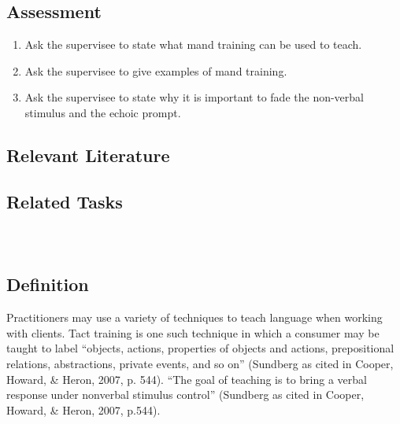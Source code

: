 \subsection{Assessment}
\begin{enumerate}
\item Ask the supervisee to state what mand training can be used to teach.
\item Ask the supervisee to give examples of mand training.
\item Ask the supervisee to state why it is important to fade the non-verbal stimulus and the echoic prompt.  
\end{enumerate}
%
\subsection{Relevant Literature}
\begin{refsection}
\nocite{test,alang2017police,clayton2018black}
\printbibliography[heading=none]
\end{refsection}
%
\subsection{Related Tasks}
\fourFKFourtyFour{}\\
%
%
%
%
%
%
\section{\fourdTwelve{}}
\subsection{Definition}
Practitioners may use a variety of techniques to teach language when working with clients.  Tact training is one such technique in which a consumer may be taught to label ``objects, actions, properties of objects and actions, prepositional relations, abstractions, private events, and so on''  (Sundberg as cited in Cooper, Howard, \& Heron, 2007, p. 544). ``The goal of teaching is to bring a verbal response under nonverbal stimulus control''  (Sundberg as cited in Cooper, Howard, \& Heron, 2007, p.544). 

